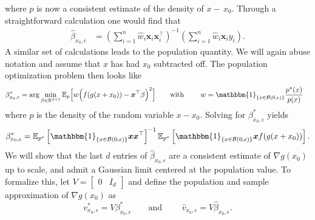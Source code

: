 \documentclass[11pt]{article}
\begin{document}
where $\hat{p}$ is now a consistent estimate of the density of $x - \,x_0$. Through a straightforward calculation one would find that
\begin{align}
    \widehat{\beta}_{x_0,\epsilon} &= \left(\sum_{i = 1}^n\hat{w}_i\boldsymbol{x}_i\boldsymbol{x}_i^{\top}\right)^{-1}\left(\sum_{i = 1}^n\hat{w}_i\boldsymbol{x}_iy_i\right). \label{eq: sample est closed form}
\end{align}
A similar set of calculations leads to the population quantity. We will again abuse notation and assume that $x$ has had $x_0$ subtracted off. The population optimization problem then looks like
\begin{align}
\beta^*_{x_0, \epsilon} &= \arg\min_{\beta \in \mathbb{R}^{d+1}} \mathbb{E}_{p} \Big[w\Big(f(g(x + x_0)) - \boldsymbol{x}^{\top}\beta \Big)^2\Big] \qquad \text{with }\qquad w = \mathbbm{1}_{\{x \in \mathcal{B}(0, \epsilon)\}}\frac{p^*(x)}{p(x)}\label{eq: population estimator}
\end{align}
where $p$ is the density of the random variable $x - x_0$. Solving for $\beta^*_{x_0, \epsilon}$ yields
\begin{align}
    \beta^*_{x_0, \epsilon} = \mathbb{E}_{p^*}\left[\mathbbm{1}_{\{x \in \mathcal{B}(0,\epsilon)\}}\boldsymbol{x}\boldsymbol{x}^{\top}\right]^{-1}\mathbb{E}_{p^*}\left[\mathbbm{1}_{\{x \in \mathcal{B}(0,\epsilon)\}}\boldsymbol{x}f(g(x+x_0))\right]. \label{eq: population estimator closed form}
\end{align}
We will show that the last $d$ entries of $\widehat{\beta}_{x_0,\epsilon}$ are a consistent estimate of $\nabla g(x_0)$ up to scale, and admit a Gaussian limit centered at the population value. To formalize this, let $V = \begin{bmatrix} 0 & I_d\end{bmatrix}$ and define the population and sample approximation of $\nabla g(x_0)$ as
\begin{equation}
    v^*_{x_0, \epsilon} = V\beta^*_{x_0, \epsilon} \qquad \text{and }\qquad \hat{v}_{x_0, \epsilon} = V\hat{\beta}_{x_0, \epsilon}. \label{eq: velocity estimator}
\end{equation}
\end{document}
